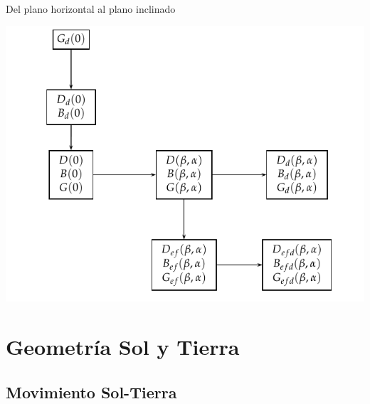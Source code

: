 \documentclass[xcolor={usenames,svgnames,dvipsnames}]{beamer}
\begin{document}
\begin{frame}[label={sec:org89d9b81}]{Del plano horizontal al plano inclinado}
\begin{center}
\includegraphics[width=.9\linewidth]{../figs/ProcedimientoCalculoRadiacionInclinada.pdf}
\end{center}
\end{frame}

\section{Geometría Sol y Tierra}
\label{sec:org743434a}
\subsection{Movimiento Sol-Tierra}
\label{sec:org4a03aef}
\end{document}
